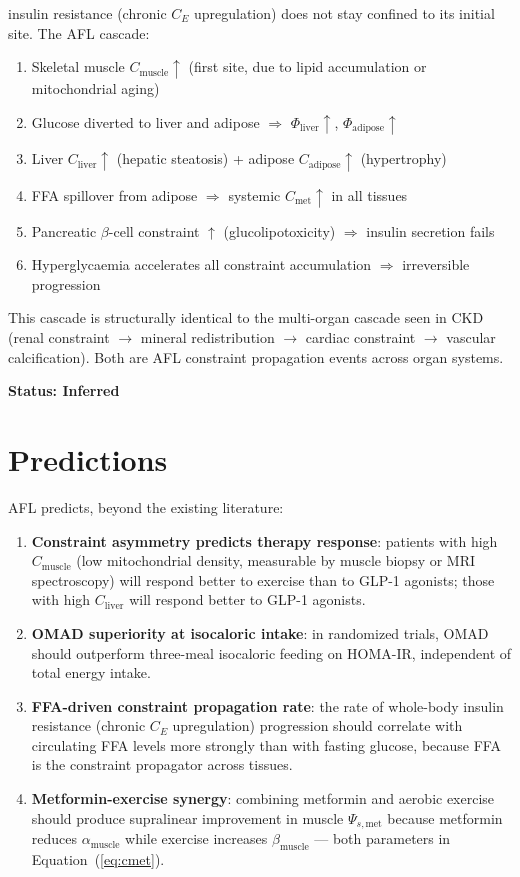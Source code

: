 \documentclass[11pt]{article}
\begin{document}
insulin resistance (chronic $C_E$ upregulation) does not stay confined to its initial site. The AFL cascade:

\begin{enumerate}
    \item Skeletal muscle $C_{\mathrm{muscle}} \uparrow$ (first site, due to lipid accumulation or mitochondrial aging)
    \item Glucose diverted to liver and adipose $\Rightarrow$ $\Phi_{\mathrm{liver}} \uparrow$, $\Phi_{\mathrm{adipose}} \uparrow$
    \item Liver $C_{\mathrm{liver}} \uparrow$ (hepatic steatosis) + adipose $C_{\mathrm{adipose}} \uparrow$ (hypertrophy)
    \item FFA spillover from adipose $\Rightarrow$ systemic $C_{\mathrm{met}} \uparrow$ in all tissues
    \item Pancreatic $\beta$-cell constraint $\uparrow$ (glucolipotoxicity) $\Rightarrow$ insulin secretion fails
    \item Hyperglycaemia accelerates all constraint accumulation $\Rightarrow$ irreversible progression
\end{enumerate}

This cascade is structurally identical to the multi-organ cascade seen in CKD (renal constraint $\to$ mineral redistribution $\to$ cardiac constraint $\to$ vascular calcification). Both are AFL constraint propagation events across organ systems.

\textbf{Status: Inferred}

\section{Predictions}

AFL predicts, beyond the existing literature:

\begin{enumerate}
    \item \textbf{Constraint asymmetry predicts therapy response}: patients with high $C_{\mathrm{muscle}}$ (low mitochondrial density, measurable by muscle biopsy or MRI spectroscopy) will respond better to exercise than to GLP-1 agonists; those with high $C_{\mathrm{liver}}$ will respond better to GLP-1 agonists.
    \item \textbf{OMAD superiority at isocaloric intake}: in randomized trials, OMAD should outperform three-meal isocaloric feeding on HOMA-IR, independent of total energy intake.
    \item \textbf{FFA-driven constraint propagation rate}: the rate of whole-body insulin resistance (chronic $C_E$ upregulation) progression should correlate with circulating FFA levels more strongly than with fasting glucose, because FFA is the constraint propagator across tissues.
    \item \textbf{Metformin-exercise synergy}: combining metformin and aerobic exercise should produce supralinear improvement in muscle $\Psi_{s,\mathrm{met}}$ because metformin reduces $\alpha_{\mathrm{muscle}}$ while exercise increases $\beta_{\mathrm{muscle}}$ --- both parameters in Equation~(\ref{eq:cmet}).
\end{enumerate}
\end{document}
